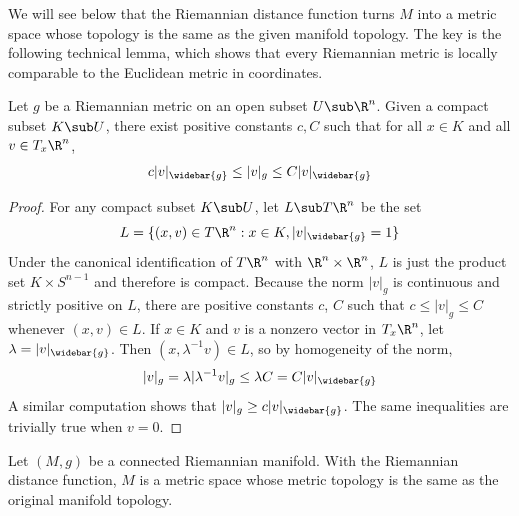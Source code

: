 We will see below that the Riemannian distance function turns $M$ into a metric space whose topology is the same as the given manifold topology. The key is the following technical lemma, which shows that every Riemannian metric is locally comparable to the Euclidean metric in coordinates.
\begin{lemma}\label{Riemann metric lem}
Let $g$ be a Riemannian metric on an open subset $U\sub\R^n$. Given a compact subset $K\sub U$, there exist positive constants $c,C$ such that for all $x\in K$ and all $v\in T_x\R^n$,
\begin{align}\label{Riemann metric-1}
c|v|_{\widebar{g}}\leq|v|_{g}\leq C|v|_{\widebar{g}}
\end{align}
\end{lemma}
\begin{proof}
For any compact subset $K\sub U$, let $L\sub T\R^n$ be the set
\[L=\{(x,v)\in T\R^n:x\in K,|v|_{\widebar{g}}=1\}\]
Under the canonical identification of $T\R^n$ with $\R^n\times\R^n$, $L$ is just the product set $K\times S^{n-1}$ and therefore is compact. Because the norm $|v|_g$ is continuous and strictly positive on $L$, there are positive constants $c$, $C$ such that $c\leq|v|_g\leq C$ whenever $(x,v)\in L$. If $x\in K$ and $v$ is a nonzero vector in $T_x\R^n$, let $\lambda=|v|_{\widebar{g}}$. Then $(x,\lambda^{-1}v)\in L$, so by homogeneity of the norm,
\[|v|_g=\lambda|\lambda^{-1}v|_g\leq\lambda C=C|v|_{\widebar{g}}\]
A similar computation shows that $|v|_g\geq c|v|_{\widebar{g}}$. The same inequalities are trivially true when $v=0$.
\end{proof}
\begin{theorem}\label{Riemann metric space}
Let $(M,g)$ be a connected Riemannian manifold. With the Riemannian distance function, $M$ is a metric space whose metric topology is the same as the original manifold topology.
\end{theorem}
